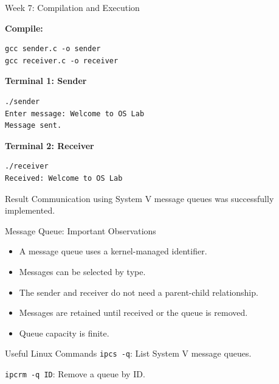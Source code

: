 \documentclass[aspectratio=169,10pt]{beamer}
\begin{document}
\begin{frame}[fragile]{Week 7: Compilation and Execution}

\textbf{Compile:}

\begin{lstlisting}[style=terminal]
gcc sender.c -o sender
gcc receiver.c -o receiver
\end{lstlisting}

\textbf{Terminal 1: Sender}

\begin{lstlisting}[style=terminal]
./sender
Enter message: Welcome to OS Lab
Message sent.
\end{lstlisting}

\textbf{Terminal 2: Receiver}

\begin{lstlisting}[style=terminal]
./receiver
Received: Welcome to OS Lab
\end{lstlisting}

\begin{block}{Result}
Communication using System V message
queues was successfully implemented.
\end{block}

\end{frame}

\begin{frame}{Message Queue: Important Observations}

\begin{itemize}
    \item A message queue uses a kernel-managed
    identifier.
    \item Messages can be selected by type.
    \item The sender and receiver do not need
    a parent-child relationship.
    \item Messages are retained until received
    or the queue is removed.
    \item Queue capacity is finite.
\end{itemize}

\begin{block}{Useful Linux Commands}
\texttt{ipcs -q}: List System V message queues.

\texttt{ipcrm -q ID}: Remove a queue by ID.
\end{block}

\end{frame}
\end{document}
